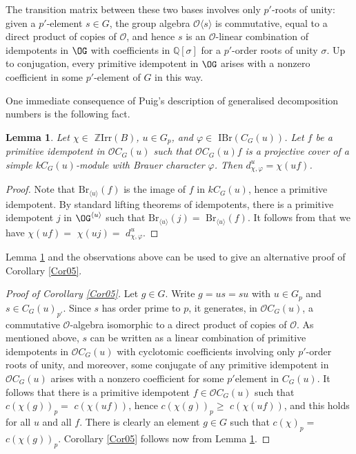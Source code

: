 \documentclass{amsart} %
\theoremstyle{plain}\newtheorem{Theorem}{Theorem}[section]
\theoremstyle{plain}\newtheorem{Conjecture}[Theorem]{Conjecture}
\theoremstyle{plain}\newtheorem{Corollary}[Theorem]{Corollary}
\theoremstyle{plain}\newtheorem{Lemma}[Theorem]{Lemma}
\theoremstyle{plain}\newtheorem{Proposition}[Theorem]{Proposition}
\theoremstyle{definition}\newtheorem{Definition}[Theorem]{Definition}
\theoremstyle{definition}\newtheorem{Example}[Theorem]{Example}
\theoremstyle{definition}\newtheorem{Examples}[Theorem]{Examples}
\theoremstyle{definition}\newtheorem{Remark}[Theorem]{Remark}
\theoremstyle{definition}\newtheorem{Remarks}[Theorem]{Remarks}
\theoremstyle{plain}\newtheorem{Statement}[Theorem]{}
\def\CO{{\mathcal{O}}}
\def\Q{{\mathbb Q}}               \def\bV{\mathbf{V}}
\def\Z{{\mathbb Z}}
\def\Br{\mathrm{Br}}             \def\ten{\otimes}
\def\IBr{\mathrm{IBr}}
\def\Irr{\mathrm{Irr}}           \def\tenK{\otimes_K}
\begin{document}
\medskip
The transition matrix between these two bases involves only $p'$-roots of
unity: given a $p'$-element $s\in G$, the group algebra $\CO\langle s\rangle$ is
commutative, equal to a direct product of copies of $\CO$, and hence
$s$ is an $\CO$-linear combination of idempotents in $\OG$ with
coefficients in $\Q[\sigma]$ for a $p'$-order roots of unity $\sigma$. 
Up to conjugation,
every primitive idempotent in $\OG$ arises with a nonzero coefficient
in some $p'$-element of $G$ in this way.

\medskip
One immediate consequence of Puig's description of generalised decomposition 
numbers   is the following fact.

\begin{Lemma} \label{lem05}
Let $\chi\in$ $\Z\Irr(B)$, $u\in G_p$, and $\varphi\in$  $\IBr(C_G(u))$.
Let $f$ be a primitive idempotent in $\CO C_G(u)$ such that $\CO C_G(u)f$
is a projective cover of a simple $kC_G(u)$-module with Brauer character $\varphi$.
Then $d^u_{\chi, \varphi} = \chi(uf)$.
\end{Lemma}

\begin{proof}
Note that $\Br_{\langle u\rangle}(f)$ is the image of $f$ in $kC_G(u)$, hence
a primitive idempotent. By standard lifting theorems of idempotents, there is
a primitive idempotent $j$ in $\OG^{\langle u\rangle}$ such that
$\Br_{\langle u\rangle}(j)=$ $\Br_{\langle u\rangle}(f)$. 
It follows from  \cite[Theorem 5.12.16]{LiBookI} that we have $\chi(uf)=$
$\chi(uj)=$ $d^u_{\chi, \varphi}$.
\end{proof}

 Lemma \ref{lem05} and the observations above 
 can be used  to give an alternative proof of Corollary \ref{Cor05}.

\begin{proof}[Proof of Corollary \ref{Cor05}]
Let $g\in G$. 
Write $g=us=su$ with $u\in G_p$ and $s\in C_G(u)_{p'}$. 
Since $s$ has order
prime to $p$, it generates, in $\CO C_G(u)$, 
a commutative $\CO$-algebra isomorphic to a direct product of copies of $\CO$.
As mentioned above, $s$ can be written as a linear combination of primitive idempotents
in $\CO C_G(u)$ with cyclotomic coefficients involving only $p'$-order roots of
unity, and moreover, some conjugate of any primitive idempotent in $\CO C_G(u)$ 
arises with a nonzero coefficient for some $p'$element in $C_G(u)$.
 It follows that there is a primitive idempotent $f\in \CO C_G(u)$ such that
$c(\chi(g))_p=$ $c(\chi(uf))$, hence $c(\chi(g))_p\geq$ $c(\chi(uf))$, and this 
holds for all $u$ and all $f$.
There is clearly an element $g\in G$ such that $c(\chi)_p=$ $c(\chi(g))_p$.
Corollary \ref{Cor05} follows now from Lemma \ref{lem05}.
\end{proof}
\end{document}
